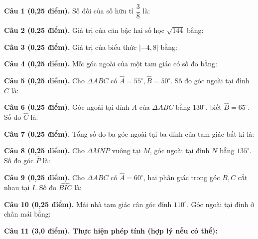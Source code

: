 \documentclass[12pt,a4paper]{article}
\begin{document}
\vspace{1.5mm}
\noindent\textbf{Câu 1 (0,25 điểm).} Số đối của số hữu tỉ $\dfrac{3}{8}$ là: \par\vspace{2.7mm}
\noindent\textbf{Câu 2 (0,25 điểm).} Giá trị của căn bậc hai số học $\sqrt{144}$ bằng: \par\vspace{2.7mm}
\noindent\textbf{Câu 3 (0,25 điểm).} Giá trị của biểu thức $|-4{,}8|$ bằng: \par\vspace{2.7mm}
\noindent\textbf{Câu 4 (0,25 điểm).} Mỗi góc ngoài của một tam giác có số đo bằng: \par\vspace{2.7mm}
\noindent\textbf{Câu 5 (0,25 điểm).} Cho $\Delta ABC$ có $\widehat{A} = 55^\circ, \widehat{B} = 50^\circ$. Số đo góc ngoài tại đỉnh $C$ là: \par\vspace{2.7mm}
\noindent\textbf{Câu 6 (0,25 điểm).} Góc ngoài tại đỉnh $A$ của $\Delta ABC$ bằng $130^\circ$, biết $\widehat{B} = 65^\circ$. Số đo $\widehat{C}$ là: \par\vspace{2.7mm}
\noindent\textbf{Câu 7 (0,25 điểm).} Tổng số đo ba góc ngoài tại ba đỉnh của tam giác bất kì là: \par\vspace{2.7mm}
\noindent\textbf{Câu 8 (0,25 điểm).} Cho $\Delta MNP$ vuông tại $M$, góc ngoài tại đỉnh $N$ bằng $135^\circ$. Số đo góc $\widehat{P}$ là: \par\vspace{2.7mm}
\noindent\textbf{Câu 9 (0,25 điểm).} Cho $\Delta ABC$ có $\widehat{A} = 60^\circ$, hai phân giác trong góc $B, C$ cắt nhau tại $I$. Số đo $\widehat{BIC}$ là: \par\vspace{2.7mm}
\noindent\textbf{Câu 10 (0,25 điểm).} Mái nhà tam giác cân góc đỉnh $110^\circ$. Góc ngoài tại đỉnh ở chân mái bằng: \par\vspace{2.7mm}
\vspace{0.2mm}
\noindent\textbf{Câu 11 (3,0 điểm). Thực hiện phép tính (hợp lý nếu có thể):}
\vspace{0.8mm}
\end{document}
